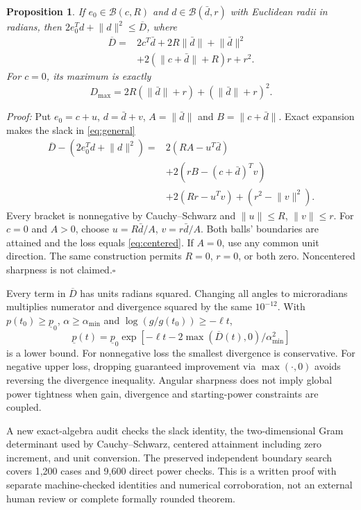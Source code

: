 \documentclass[10pt,journal]{IEEEtran}
\newtheorem{proposition}{Proposition}
\newcommand{\norm}[1]{\lVert#1\rVert}
\begin{document}
\begin{proposition}
If $e_0\in\mathcal B(c,R)$ and $d\in\mathcal B(\bar d,r)$ with Euclidean radii in radians, then $2e_0^Td+\norm d^2\leq\overline D$, where
\begin{align}
\overline D={}&2c^T\bar d+2R\norm{\bar d}+\norm{\bar d}^2\nonumber\\
&+2(\norm{c+\bar d}+R)r+r^2.
\label{eq:general}
\end{align}
For $c=0$, its maximum is exactly
\begin{equation}
D_{\max}=2R(\norm{\bar d}+r)+(\norm{\bar d}+r)^2.
\label{eq:centered}
\end{equation}
\end{proposition}
\emph{Proof:} Put $e_0=c+u$, $d=\bar d+v$, $A=\norm{\bar d}$ and $B=\norm{c+\bar d}$. Exact expansion makes the slack in \eqref{eq:general}
\begin{align}
\overline D-(2e_0^Td+\norm d^2)
={}&2(RA-u^T\bar d)\nonumber\\
&+2(rB-(c+\bar d)^Tv)\nonumber\\
&+2(Rr-u^Tv)+(r^2-\norm v^2).
\end{align}
Every bracket is nonnegative by Cauchy--Schwarz and $\norm u\leq R$, $\norm v\leq r$. For $c=0$ and $A>0$, choose $u=R\bar d/A$, $v=r\bar d/A$. Both balls' boundaries are attained and the loss equals \eqref{eq:centered}. If $A=0$, use any common unit direction. The same construction permits $R=0$, $r=0$, or both zero. Noncentered sharpness is not claimed.\hfill$\square$

Every term in $\overline D$ has units radians squared. Changing all angles to microradians multiplies numerator and divergence squared by the same $10^{-12}$. With $p(t_0)\geq\underline p_0$, $\alpha\geq\alpha_{\min}$ and $\log(g/g(t_0))\geq-\ell t$,
\begin{equation}
\underline p(t)=\underline p_0\exp[-\ell t-2\max(\overline D(t),0)/\alpha_{\min}^2]
\label{eq:power}
\end{equation}
is a lower bound. For nonnegative loss the smallest divergence is conservative. For negative upper loss, dropping guaranteed improvement via $\max(\cdot,0)$ avoids reversing the divergence inequality. Angular sharpness does not imply global power tightness when gain, divergence and starting-power constraints are coupled.

A new exact-algebra audit checks the slack identity, the two-dimensional Gram determinant used by Cauchy--Schwarz, centered attainment including zero increment, and unit conversion. The preserved independent boundary search covers 1,200 cases and 9,600 direct power checks. This is a written proof with separate machine-checked identities and numerical corroboration, not an external human review or complete formally rounded theorem.
\end{document}
